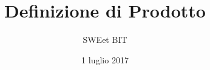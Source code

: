 



\title{\textbf{Definizione di Prodotto}}
\author{SWEet BIT}

\date{1 luglio 2017}
\setcounter{tocdepth}{4}



\makeFrontPage

\tableofcontents
\newpage
\listoffigures
\newpage
\listoftables
\newpage




